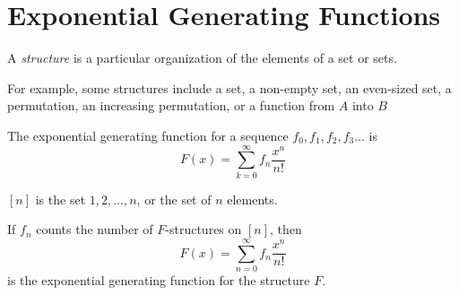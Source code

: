 

\label{25-0402}
\section{Exponential Generating Functions}

\begin{definition}
    A \emph{structure} is a particular organization of the elements
     of a set or sets.
\end{definition}
For example, some structures include a set, a non-empty set, 
an even-sized set, a permutation, an increasing permutation, 
or a function from $A$ into $B$
\begin{definition}
    The exponential generating function for a sequence 
    $f_{0}, f_{1}, f_{2}, f_{3} \ldots$ is
\[
    F(x)=\sum_{k=0}^{\infty} f_{n} \frac{x^{n}}{n !}
\]
\end{definition}
\begin{definition}
    $[n]$ is the set $1,2, \ldots, n$, or the set of $n$ elements.
\end{definition}
\begin{theorem}
    If $f_{n}$ counts the number of $F$-structures on $[n]$, then
\[
    F(x)=\sum_{n=0}^{\infty} f_{n} \frac{x^{n}}{n !}
\]
is the exponential generating function for the structure $F$.
\end{theorem}

